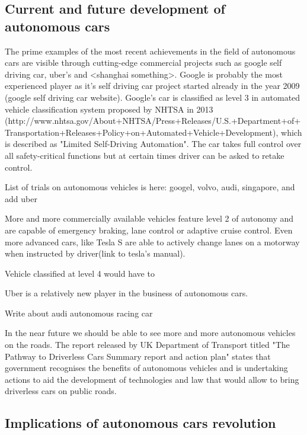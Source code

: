 \documentclass[11pt,english]{article}
\begin{document}
\subsection{Current and future development of autonomous cars}

The prime examples of the most recent achievements in the field of autonomous cars are visible through cutting-edge commercial projects such as google self driving car, uber's and <shanghai something>. Google is probably the most experienced player as it's self driving car project started already in the year 2009 (google self driving car website).
Google's car is classified as level 3 in automated vehicle classification system proposed by NHTSA in 2013 (http://www.nhtsa.gov/About+NHTSA/Press+Releases/U.S.+Department+of+Transportation+Releases+Policy+on+Automated+Vehicle+Development), which is described as "Limited Self-Driving Automation". The car takes full control over all safety-critical functions but at certain times driver can be asked to retake control. 

List of trials on autonomous vehicles is here:
\citep{parkin2016understanding}
googel, volvo, audi, singapore, and add uber


More and more commercially available vehicles feature level 2 of autonomy and are capable of emergency braking, lane control or adaptive cruise control. Even more advanced cars, like Tesla S are able to actively change lanes on a motorway when instructed by driver(link to tesla's manual).


Vehicle classified at level 4 would have to 


Uber is a relatively new player in the business of autonomous cars. 



Write about audi autonomous racing car


In the near future we should be able to see more and more autonomous vehicles on the roads.
The report released by UK Department of Transport titled "The Pathway to Driverless Cars Summary report and action plan" \citep{pathwaytodriverless} states that government recognises the benefits of autonomous vehicles and is undertaking actions to aid the development of technologies and law that would allow to bring driverless cars on public roads. 


\subsection{Implications of autonomous cars revolution}
\end{document}
